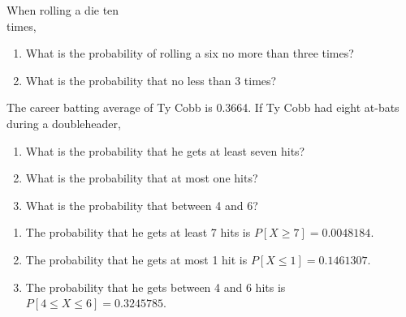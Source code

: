 \documentclass[11pt, chapterprefix=true]{scrbook}\usepackage[]{graphicx}\usepackage[]{color}
\begin{document}
\begin{exercises}
  \begin{exercise} %

When rolling a die ten \\ times,

\begin{enumerate}
\item What is the probability of rolling a six no more than three times?
\item What is the probability that no less than 3 times?
\end{enumerate}
	\end{exercise}
%
%

  \begin{exercise} %

The career batting average of Ty Cobb is 0.3664. If Ty Cobb had eight at-bats during a doubleheader,

\begin{enumerate}
\item What is the probability that he gets at least seven hits?
\item What is the probability that at most one hits?
\item What is the probability that between 4 and 6?
\end{enumerate}
	\end{exercise}
	\begin{solution}  %


\begin{enumerate}
\item The probability that he gets at least 7 hits is $P[X \ge 7] = 0.0048184$.
\item The probability that he gets at most 1 hit is $P[X \le 1] = 0.1461307$.
\item The probability that he gets between 4 and 6 hits is $P[4 \le X \le 6] = 0.3245785$.
\end{enumerate}


\end{solution}
\end{exercises}
\end{document}
